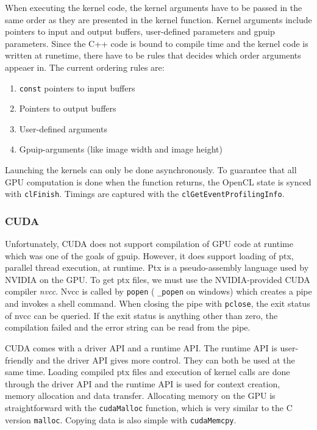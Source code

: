 When executing the kernel code, the kernel arguments have to be passed in the same order as they are presented in the kernel function. Kernel arguments include pointers to input and output buffers, user-defined parameters and gpuip parameters. Since the C++ code is bound to compile time and the kernel code is written at runetime,  there have to be rules that decides which order arguments appeaer in. The current ordering rules are:

\begin{enumerate}
\item {\tt const} pointers to input buffers
\item Pointers to output buffers
\item User-defined arguments
\item Gpuip-arguments (like image width and image height)
\end{enumerate}

Launching the kernels can only be done asynchronously. To guarantee that all GPU computation is done when the function returns, the OpenCL state is synced with {\tt clFinish}. Timings are captured with the {\tt clGetEventProfilingInfo}.

\subsubsection{CUDA}

Unfortunately, CUDA does not support compilation of GPU code at runtime which was one of the goals of gpuip. However, it does support loading of ptx, parallel thread execution, at runtime. Ptx is a pseudo-assembly language used by NVIDIA on the GPU. To get ptx files, we must use the NVIDIA-provided CUDA compiler \emph{nvcc}. Nvcc is called by {\tt popen} ( {\tt \_popen} on windows) which creates a pipe and invokes a shell command. When closing the pipe with {\tt pclose}, the exit status of nvcc can be queried. If the exit status is anything other than zero, the compilation failed and the error string can be read from the pipe.
\newline

CUDA comes with a driver API and a runtime API. The runtime API is user-friendly and the driver API gives more control. They can both be used at the same time. Loading compiled ptx files and execution of kernel calls are done through the driver API and the runtime API is used for context creation, memory allocation and data transfer. Allocating memory on the GPU is straightforward with the {\tt cudaMalloc} function, which is very similar to the C version {\tt malloc}. Copying data is also simple with {\tt cudaMemcpy}.
\newline


